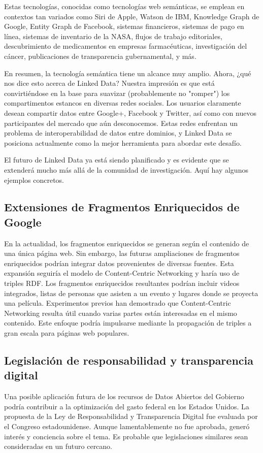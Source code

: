 \documentclass[11pt]{report}
\begin{document}
Estas tecnologías, conocidas como tecnologías web semánticas, se emplean en contextos tan variados como Siri de Apple, Watson de IBM, Knowledge Graph de Google, Entity Graph de Facebook, sistemas financieros, sistemas de pago en línea, sistemas de inventario de la NASA, flujos de trabajo editoriales, descubrimiento de medicamentos en empresas farmacéuticas, investigación del cáncer, publicaciones de transparencia gubernamental, y más.

En resumen, la tecnología semántica tiene un alcance muy amplio. Ahora, ¿qué nos dice esto acerca de Linked Data? Nuestra impresión es que está convirtiéndose en la base para suavizar (probablemente no "romper") los compartimentos estancos en diversas redes sociales. Los usuarios claramente desean compartir datos entre Google+, Facebook y Twitter, así como con nuevos participantes del mercado que aún desconocemos. Estas redes enfrentan un problema de interoperabilidad de datos entre dominios, y Linked Data se posiciona actualmente como la mejor herramienta para abordar este desafío.

El futuro de Linked Data ya está siendo planificado y es evidente que se extenderá mucho más allá de la comunidad de investigación. Aquí hay algunos ejemplos concretos.

\subsection*{Extensiones de Fragmentos Enriquecidos de Google}

		En la actualidad, los fragmentos enriquecidos se generan según el contenido de una única página web. Sin embargo, las futuras ampliaciones de fragmentos enriquecidos podrían integrar datos provenientes de diversas fuentes. Esta expansión seguiría el modelo de Content-Centric Networking y haría uso de triples RDF. Los fragmentos enriquecidos resultantes podrían incluir videos integrados, listas de personas que asisten a un evento y lugares donde se proyecta una película. Experimentos previos han demostrado que Content-Centric Networking resulta útil cuando varias partes están interesadas en el mismo contenido. Este enfoque podría impulsarse mediante la propagación de triples a gran escala para páginas web populares.
\subsection*{Legislación de responsabilidad y transparencia digital}

		Una posible aplicación futura de los recursos de Datos Abiertos del Gobierno podría contribuir a la optimización del gasto federal en los Estados Unidos. La propuesta de la Ley de Responsabilidad y Transparencia Digital fue evaluada por el Congreso estadounidense. Aunque lamentablemente no fue aprobada, generó interés y conciencia sobre el tema. Es probable que legislaciones similares sean consideradas en un futuro cercano. 
  
\end{document}
